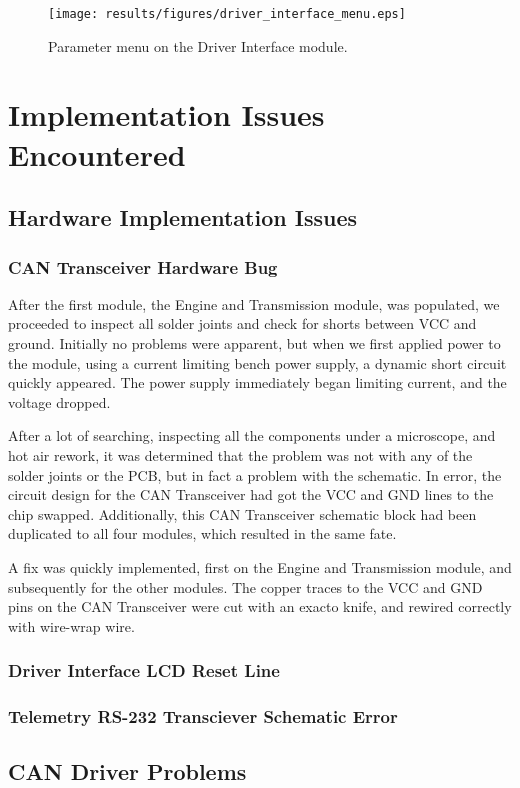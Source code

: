 \begin{figure}[h!]
 \centering
 \texttt{[image: results/figures/driver\_interface\_menu.eps]}
 \caption{Parameter menu on the Driver Interface module.}
 \label{fig:driver_interface_menu}
\end{figure}



\section{Implementation Issues Encountered}


\subsection{Hardware Implementation Issues}


\subsubsection{CAN Transceiver Hardware Bug}

After the first module, the Engine and Transmission module, was populated, we proceeded to inspect all solder joints and check for shorts between VCC and ground. Initially no problems were apparent, but when we first applied power to the module, using a current limiting bench power supply, a dynamic short circuit quickly appeared. The power supply immediately began limiting current, and the voltage dropped.

After a lot of searching, inspecting all the components under a microscope, and hot air rework, it was determined that the problem was not with any of the solder joints or the PCB, but in fact a problem with the schematic. In error, the circuit design for the CAN Transceiver had got the VCC and GND lines to the chip swapped. Additionally, this CAN Transceiver schematic block had been duplicated to all four modules, which resulted in the same fate.

A fix was quickly implemented, first on the Engine and Transmission module, and subsequently for the other modules. The copper traces to the VCC and GND pins on the CAN Transceiver were cut with an exacto knife, and rewired correctly with wire-wrap wire.


\subsubsection{Driver Interface LCD Reset Line}


\subsubsection{Telemetry RS-232 Transciever Schematic Error}





\subsection{CAN Driver Problems}